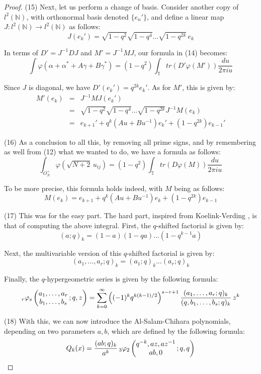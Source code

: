 \documentclass[12pt]{amsbook}
\begin{document}
\begin{proof}
(15) Next, let us perform a change of basis. Consider another copy of $l^2(\mathbb N)$, with orthonormal basis denoted $\{e_n'\}$, and define a linear map $J:l^2(\mathbb N)\to l^2(\mathbb N)$ as follows:
$$J(e_k')=\sqrt{1-q^2}\sqrt{1-q^4}\ldots\sqrt{1-q^{2k}}\,e_k$$

In terms of $D'=J^{-1}DJ$ and $M'=J^{-1}MJ$, our formula in (14) becomes:
$$\int\varphi(\alpha+\alpha^*+A\gamma+B\gamma^*)=(1-q^2)\int_{\mathbb T}tr(D'\varphi(M'))\frac{du}{2\pi iu}$$

Since $J$ is diagonal, we have $D'(e_k')=q^{2k}e_k'$. As for $M'$, this is given by:
\begin{eqnarray*}
M'(e_k)
&=&J^{-1}MJ(e_k')\\
&=&\sqrt{1-q^2}\sqrt{1-q^4}\ldots\sqrt{1-q^{2k}}J^{-1}M(e_k)\\
&=&e_{k+1}'+q^k(Au+Bu^{-1})e_k'+(1-q^{2k})e_{k-1}'
\end{eqnarray*}

(16) As a conclusion to all this, by removing all prime signs, and by remembering as well from (12) what we wanted to do, we have a formula as follows:
$$\int_{O_N^+}\varphi(\sqrt{N+2}\,u_{ij})=(1-q^2)\int_{\mathbb T}tr(D\varphi(M))\frac{du}{2\pi iu}$$

To be more precise, this formula holds indeed, with $M$ being as follows:
$$M(e_k)=e_{k+1}+q^k(Au+Bu^{-1})e_k+(1-q^{2k})e_{k-1}$$

(17) This was for the easy part. The hard part, inspired from Koelink-Verding \cite{kve}, is that of computing the above integral. First, the $q$-shifted factorial is given by:
$$(a;q)_k=(1-a)(1-qa)\ldots(1-q^{k-1}a)$$

Next, the multivariable version of this $q$-shifted factorial is given by:
$$(a_1,\ldots,a_r;q)_k=(a_1;q)_k\ldots(a_r;q)_k$$

Finally, the $q$-hypergeometric series is given by the following formula:
$${}_r\varphi_s\left(\begin{matrix}{a_1,\ldots,a_r}\cr {b_1,\ldots,b_s}\end{matrix}\,;q,z\right)
=\sum_{k=0}^\infty\left( (-1)^k q^{k(k-1)/2}\right)^{s-r+1}\frac{(a_1,\ldots,a_r;q)_k}{(q,b_1,\ldots,b_s;q)_k}\,z^k$$

(18) With this, we can now introduce the Al-Salam-Chihara polynomials, depending on two parameters $a,b$, which are defined by the following formula:
$$Q_k(x)=\frac{(ab;q)_k}{a^k}\,{}_3\varphi_2\left(\begin{matrix}q^{-k},az,az^{-1}\cr ab,0\end{matrix}\,;q,q\right)$$


\end{proof}
\end{document}
